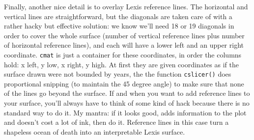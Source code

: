 \documentclass[a4paper]{article}
\begin{document}
Finally, another nice detail is to overlay Lexis reference lines. The horizontal and vertical lines are straightforward, but the diagonals are taken care of with a rather hacky but effective solution: we know we'll need 18 or 19 diagonals in order  to cover the whole surface (number of vertical reference lines plus number of horizontal reference lines), and each will have a lower left and an upper right coordinate. \texttt{cmat} is just a container for these coordinates, in order the columns hold: x left, y low, x right, y high. At first they are given coordinates as if the surface drawn were not bounded by years, the the function \texttt{cslicer()} does proportional snipping (to maintain the 45 degree angle) to make sure that none of the lines go beyond the surface. If and when you want to add reference lines to your surface, you'll always have to think of some kind of hack because there is no standard way to do it. My mantra: if it looks good, adds information to the plot and doesn't cost a lot of ink, then do it. Reference lines in this case turn a shapeless ocean of death into an interpretable Lexis surface.
\end{document}
